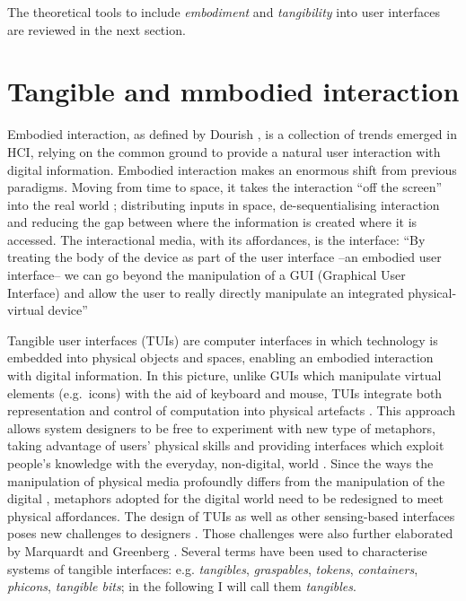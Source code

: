 The theoretical tools to include \emph{embodiment} and \emph{tangibility} into user interfaces are reviewed in the next section.

\section{Tangible and mmbodied interaction}\label{tangible-interfaces-and-embodied-interaction}

Embodied interaction, as defined by Dourish \autocite{Dourish:2001vc}, is a collection of trends emerged in HCI, relying on the common ground to provide a natural user interaction with digital information. Embodied interaction makes an enormous shift from previous paradigms. Moving from time to space, it takes the interaction ``off the screen'' into the real world \autocite{Dourish:2001vc}; distributing inputs in space, de-sequentialising interaction and reducing the gap between where the information is created where it is accessed. The interactional media, with its affordances, is the interface: ``By treating the body of the device as part of the user interface --an embodied user interface-- we can go beyond the manipulation of a GUI (Graphical User Interface) and allow the user to really directly manipulate an integrated physical-virtual device'' \autocite{Fishkin:2000df}

Tangible user interfaces (TUIs) are computer interfaces in which technology is embedded into physical objects and spaces, enabling an embodied interaction with digital information. In this picture, unlike GUIs which manipulate virtual elements (e.g.~icons) with the aid of keyboard and mouse, TUIs integrate both representation and control of computation into physical artefacts \autocite{krumm2009ubiquitous}. This approach allows system designers to be free to experiment with new type of metaphors, taking advantage of users' physical skills and providing interfaces which exploit people's knowledge with the everyday, non-digital, world \autocite{Jacob:2008vm}. Since the ways the manipulation of physical media profoundly differs from the manipulation of the digital \autocite{Terrenghi:2007uv}, metaphors adopted for the digital world need to be redesigned to meet physical affordances. The design of TUIs as well as other sensing-based interfaces poses new challenges to designers \autocite{Bellotti:2002wg}. Those challenges were also further elaborated by Marquardt and Greenberg \autocite*{Marquardt:2012tg}. Several terms have been used to characterise systems of tangible interfaces: e.g. \emph{tangibles}, \emph{graspables}, \emph{tokens}, \emph{containers}, \emph{phicons}, \emph{tangible bits}; in the following I will call them \emph{tangibles}.

